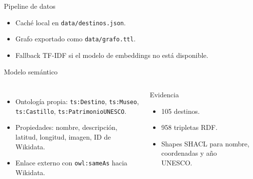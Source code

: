 \documentclass[10pt,aspectratio=169]{beamer}
\begin{document}
\begin{frame}{Pipeline de datos}
  \centering
  \vspace{0.55cm}
  \begin{itemize}
    \item Caché local en \texttt{data/destinos.json}.
    \item Grafo exportado como \texttt{data/grafo.ttl}.
    \item Fallback TF-IDF si el modelo de embeddings no está disponible.
  \end{itemize}
\end{frame}

\begin{frame}{Modelo semántico}
  \begin{columns}
    \begin{itemize}
      \item Ontología propia: \texttt{ts:Destino}, \texttt{ts:Museo}, \texttt{ts:Castillo}, \texttt{ts:PatrimonioUNESCO}.
      \item Propiedades: nombre, descripción, latitud, longitud, imagen, ID de Wikidata.
      \item Enlace externo con \texttt{owl:sameAs} hacia Wikidata.
    \end{itemize}
    \begin{block}{Evidencia}
      \begin{itemize}
        \item 105 destinos.
        \item 958 tripletas RDF.
        \item Shapes SHACL para nombre, coordenadas y año UNESCO.
      \end{itemize}
    \end{block}
  \end{columns}
\end{frame}
\end{document}
